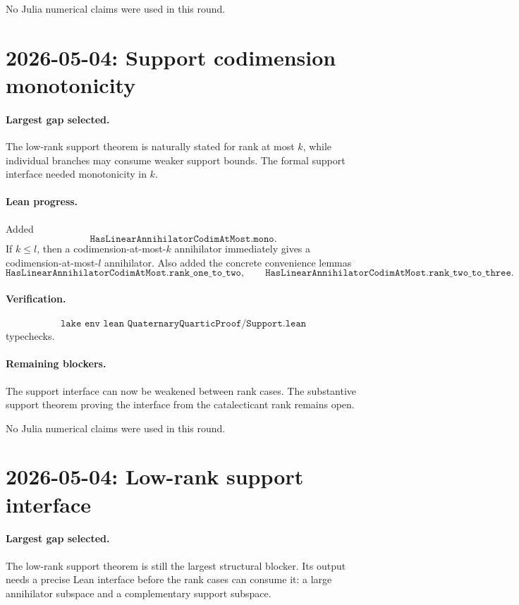 \documentclass[11pt]{article}
\begin{document}
No Julia numerical claims were used in this round.

\section*{2026-05-04: Support codimension monotonicity}

\paragraph{Largest gap selected.}
The low-rank support theorem is naturally stated for rank at most \(k\), while
individual branches may consume weaker support bounds.  The formal support
interface needed monotonicity in \(k\).

\paragraph{Lean progress.}
Added
\[
\texttt{HasLinearAnnihilatorCodimAtMost.mono}.
\]
If \(k\le l\), then a codimension-at-most-\(k\) annihilator immediately gives
a codimension-at-most-\(l\) annihilator.  Also added the concrete convenience
lemmas
\[
\texttt{HasLinearAnnihilatorCodimAtMost.rank\_one\_to\_two},\qquad
\texttt{HasLinearAnnihilatorCodimAtMost.rank\_two\_to\_three}.
\]

\paragraph{Verification.}
\[
\texttt{lake env lean QuaternaryQuarticProof/Support.lean}
\]
typechecks.

\paragraph{Remaining blockers.}
The support interface can now be weakened between rank cases.  The substantive
support theorem proving the interface from the catalecticant rank remains
open.

No Julia numerical claims were used in this round.

\section*{2026-05-04: Low-rank support interface}

\paragraph{Largest gap selected.}
The low-rank support theorem is still the largest structural blocker.  Its
output needs a precise Lean interface before the rank cases can consume it:
a large annihilator subspace and a complementary support subspace.
\end{document}
